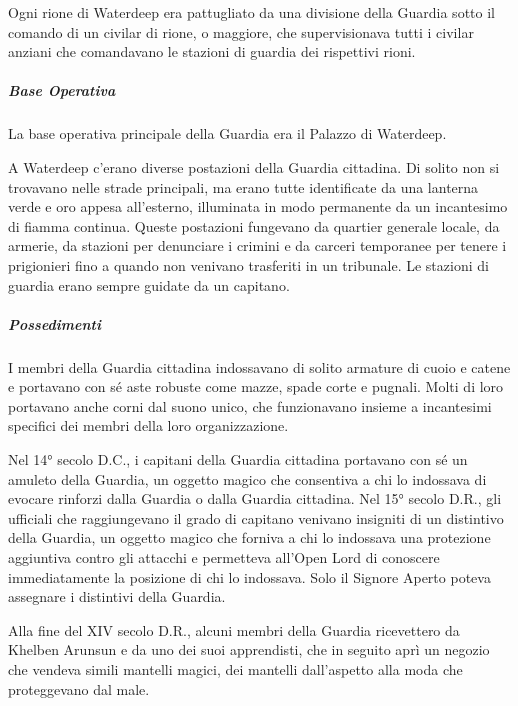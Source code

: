 \documentclass{article}
\begin{document}
                        Ogni rione di Waterdeep era pattugliato da una divisione della Guardia sotto il comando di un civilar di rione, o maggiore, che supervisionava tutti i civilar anziani che comandavano le stazioni di guardia dei rispettivi rioni.

                        \subparagraph{Base Operativa}
La base operativa principale della Guardia era il Palazzo di Waterdeep.

A Waterdeep c'erano diverse postazioni della Guardia cittadina. Di solito non si trovavano nelle strade principali, ma erano tutte identificate da una lanterna verde e oro appesa all'esterno, illuminata in modo permanente da un incantesimo di fiamma continua. Queste postazioni fungevano da quartier generale locale, da armerie, da stazioni per denunciare i crimini e da carceri temporanee per tenere i prigionieri fino a quando non venivano trasferiti in un tribunale. Le stazioni di guardia erano sempre guidate da un capitano.

\subparagraph{Possedimenti}
I membri della Guardia cittadina indossavano di solito armature di cuoio e catene e portavano con sé aste robuste come mazze, spade corte e pugnali. Molti di loro portavano anche corni dal suono unico, che funzionavano insieme a incantesimi specifici dei membri della loro organizzazione.

Nel 14° secolo D.C., i capitani della Guardia cittadina portavano con sé un amuleto della Guardia, un oggetto magico che consentiva a chi lo indossava di evocare rinforzi dalla Guardia o dalla Guardia cittadina. Nel 15° secolo D.R., gli ufficiali che raggiungevano il grado di capitano venivano insigniti di un distintivo della Guardia, un oggetto magico che forniva a chi lo indossava una protezione aggiuntiva contro gli attacchi e permetteva all'Open Lord di conoscere immediatamente la posizione di chi lo indossava. Solo il Signore Aperto poteva assegnare i distintivi della Guardia.

Alla fine del XIV secolo D.R., alcuni membri della Guardia ricevettero da Khelben Arunsun e da uno dei suoi apprendisti, che in seguito aprì un negozio che vendeva simili mantelli magici, dei mantelli dall'aspetto alla moda che proteggevano dal male.
\end{document}

